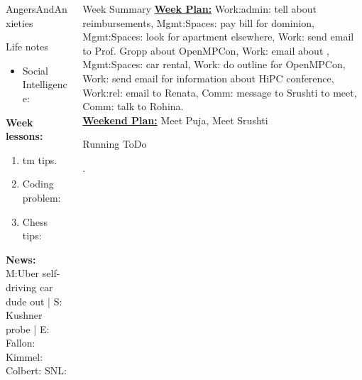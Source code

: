 \begin{multicols}{4}
\begin{columns}
\begin{column}{0.20\linewidth}
\begin{block}{AngersAndAnxieties}
\begin{itemize}
      \end{itemize}
    \end{block}
      \begin{block}{Life notes}
        \begin{itemize}
          \tiny \item \tiny Social Intelligence: 
        \end{itemize}
      \end{block}

      \begin{block}
        {\tiny {\bf Week lessons:}}
        \begin{enumerate}
        \item \tiny tm tips.
        \item \tiny Coding problem: 
        \item \tiny Chess tips: 

        \end{enumerate}
            {{\tiny {\tiny \bf  News:}} {\tiny  M:Uber self-driving
                car dude out | S: Kushner probe | E: Fallon:   Kimmel:  Colbert: SNL:}}
      \end{block}
    \end{column}
  \begin{column}{0.6\linewidth}
    \begin{block}{Week Summary} 
      {\underline {\bf Week Plan:} 
        Work:admin: tell about reimbursements, Mgmt:Spaces: pay bill
        for dominion, Mgmt:Spaces: look for apartment elsewhere,
        Work: send email to Prof. Gropp about OpenMPCon, Work: email
        about , 
        Mgmt:Spaces: car rental, Work: do outline for OpenMPCon, Work:
        send email for information about HiPC conference, Work:rel:
        email to Renata, Comm: message to Srushti to 
        meet, Comm: talk to Rohina.  } \\
      {\underline{\bf Weekend Plan:} Meet Puja, Meet Srushti }\\
    \end{block}

      \begin{block}{Running ToDo} %
        \begin{enumerate} 
          \dl{} \pr{}.


\end{enumerate}
\end{block}
\end{column}
\end{columns}
\end{multicols}
